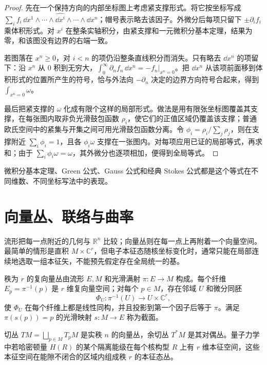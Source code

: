 \begin{proof}
先在一个保持方向的内部坐标图上考虑紧支撑形式。将它按坐标写成 $\sum_i f_i\,\dd x^1\wedge\cdots\wedge\widehat{\dd x^i}\wedge\cdots\wedge\dd x^n$；帽号表示略去该因子。外微分后每项只留下 $\pm\partial_i f_i$ 乘体积形式。对 $x^i$ 在整条实轴积分，由紧支撑和一元微积分基本定理，结果为零，和该图没有边界的右端一致。

若图落在 $x^n\ge0$，对 $i<n$ 的项仍沿整条直线积分而消失。只有略去 $\dd x^n$ 的项留下：沿 $x^n$ 从 $0$ 积到无穷大，$\int_0^\infty\partial_n f_n\,\dd x^n=-f_n|_{x^n=0}$。把 $\dd x^n$ 从该项前面移到体积形式的位置所产生的符号，恰与外法向 $-\partial_n$ 决定的边界方向符号合起来，得到 $\int_{x^n=0}\omega$。

最后把紧支撑的 $\omega$ 化成有限个这样的局部形式。做法是用有限张坐标图覆盖其支撑，在每张图内取非负光滑鼓包函数 $\rho_i$，使它们的正值区域仍覆盖该支撑；普通欧氏空间中的紧集与开集之间可用光滑鼓包函数分离。令 $\phi_i=\rho_i/\sum_j\rho_j$，则在支撑附近 $\sum_i\phi_i=1$，且各 $\phi_i\omega$ 支撑在一张图内。对每项应用已证的局部等式，再求和；由于 $\sum_i\phi_i\omega=\omega$，其外微分也逐项相加，便得到全局等式。
\end{proof}

微积分基本定理、Green 公式、Gauss 公式和经典 Stokes 公式都是这个等式在不同维数、不同坐标写法中的表现。

\section{向量丛、联络与曲率}

流形把每一点附近的几何与 \(\mathbb R^n\) 比较；向量丛则在每一点上再附着一个向量空间。最简单的情形是直积 \(M\times\mathbb C^r\)，但电子本征态随核坐标变化时，通常只能在局部连续地选取一组本征矢，不能预先假定存在全局统一的基。

\begin{definition}[向量丛与截面]
秩为 \(r\) 的复向量丛由流形 \(E,M\) 和光滑满射 \(\pi:E\to M\) 构成。每个纤维 \(E_p=\pi^{-1}(p)\) 是 \(r\) 维复向量空间；对每个 \(p\in M\)，存在邻域 \(U\) 和微分同胚
\[
\Phi_U:\pi^{-1}(U)\longrightarrow U\times\mathbb C^r,
\]
使 \(\Phi_U\) 在每个纤维上都是线性同构，并且投影到第一个因子后等于 \(\pi\)。满足 \(\pi(s(p))=p\) 的光滑映射 \(s:M\to E\) 称为截面。
\end{definition}

切丛 \(TM=\bigsqcup_{p\in M}T_pM\) 是实秩 \(n\) 的向量丛，余切丛 \(T^*M\) 是其对偶丛。量子力学中若哈密顿量 \(H(R)\) 的某个隔离能级在每个核构型 \(R\) 上有 \(r\) 维本征空间，这些本征空间在能隙不闭合的区域内组成秩 \(r\) 的本征态丛。

